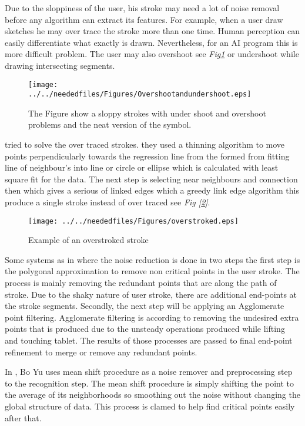  

Due to the sloppiness of the user, his stroke may need a lot of noise removal before any algorithm can extract its features. For example, when a user draw sketches he may over trace the stroke more than one time. Human perception can easily differentiate what exactly is drawn. Nevertheless, for an AI program this is more difficult problem. The user may also overshoot see \textit{Fig\ref{fig:Overshootandundershoot}} or undershoot while drawing intersecting segments. 
\begin{figure}
	\centering
		\texttt{[image: ../../neededfiles/Figures/Overshootandundershoot.eps]}
	\caption[Neat and Sloppy symbols] {The Figure show a sloppy strokes with under shoot and overshoot problems and the neat version of the symbol.}
	\label{fig:Overshootandundershoot}
\end{figure}


 \cite {overtraced24} tried to solve the over traced strokes. they used a thinning algorithm to move points perpendicularly towards the regression line from the formed from fitting line of neighbour's into line or circle or ellipse which is calculated with least square fit for the data. The next step is selecting near neighbours and connection then which gives a serious of linked edges which a greedy link edge algorithm this produce a single stroke instead of over traced see \textit{Fig [\ref {fig:overstroked}]}.

\begin{figure}
	\centering
		\texttt{[image: ../../neededfiles/Figures/overstroked.eps]}
	\caption{Example of an overstroked stroke}
	\label{fig:overstroked}
\end{figure} 
Some systems as in \cite{SmartSketch56} where the noise reduction is done in two steps the first step is the polygonal approximation to remove non critical points in the user stroke. The process is mainly removing the redundant points that are along the path of stroke. Due to the shaky nature of user stroke, there are additional end-points at the stroke segments. Secondly, the next step will be applying an Agglomerate point filtering.  Agglomerate filtering is according to \cite {statesurvey35} removing the undesired extra points that is produced due to the unsteady operations produced while lifting and touching tablet.  The results of those processes are passed to final end-point refinement to merge or remove any redundant points.

In \cite{meanshift10,domainindependent17}, Bo Yu uses mean shift procedure as a noise remover and preprocessing step to the recognition step. The mean shift procedure is simply shifting the point to the average of its neighborhoods so smoothing out the noise without changing the global structure of data.  This process is clamed to help find critical points easily after that.

